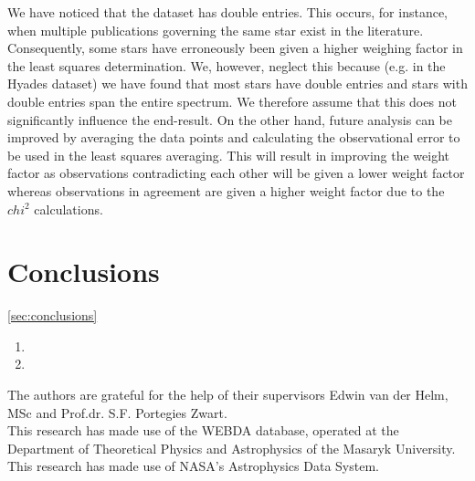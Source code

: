 \documentclass{aa}
\begin{document}
We have noticed that the dataset has double entries. This occurs, for instance, when multiple publications governing the same star exist in the literature. Consequently, some stars have erroneously been given a higher weighing factor in the least squares determination.  We, however, neglect this because (e.g. in the Hyades dataset) we have found that most stars have double entries and stars with double entries span the entire spectrum. We therefore assume that this does not significantly influence the end-result. On the other hand, future analysis can be improved by averaging the data points and calculating the observational error to be used in the least squares averaging. This will result in improving the weight factor as observations contradicting each other will be given a lower weight factor whereas observations in agreement are given a higher weight factor due to the $chi^2$ calculations.

\section{Conclusions}\ref{sec:conclusions}

   \begin{enumerate}
      \item
      \item
   \end{enumerate}


\begin{acknowledgements}
The authors are grateful for the help of their supervisors Edwin van der Helm, MSc and Prof.dr. S.F. Portegies Zwart. \\

This research has made use of the WEBDA database, operated at the Department of Theoretical Physics and Astrophysics of the Masaryk University. \\

This research has made use of NASA's Astrophysics Data System.
\end{acknowledgements}





\end{document}

